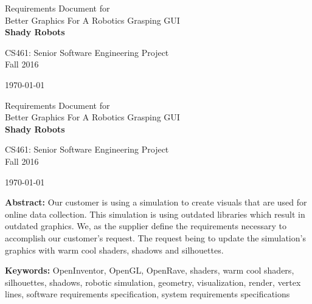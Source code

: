 \onecolumn

\begin{titlepage}
\null
\vspace{35mm}

\begin{flushleft}
\begin{bfseries}
	\vskip2mm
	\Huge{Requirements Document for\\ Better Graphics For A Robotics Grasping GUI}\\
	\vspace{30mm}
	\textbf{\huge Shady Robots} \\
	
\end{bfseries}

\vspace{15mm}
\Large{CS461: Senior Software Engineering Project} \\
\Large{Fall 2016} \\

\vspace{10mm}

\today

\end{flushleft}

\newpage
\null
\vspace{35mm}

\begin{flushleft}
\begin{bfseries}
	\vskip2mm
	\Huge{Requirements Document for\\ Better Graphics For A Robotics Grasping GUI}\\
	\vspace{30mm}
	\textbf{\huge Shady Robots} \\
	
\end{bfseries}

\vspace{15mm}
\Large{CS461: Senior Software Engineering Project} \\
\Large{Fall 2016} \\

\vspace{10mm}

\today

\vfill

\begin{normalsize}
{\bf Abstract:}
Our customer is using a simulation to create visuals that are used for online data collection.
This simulation is using outdated libraries which result in outdated graphics.
We, as the supplier define the requirements necessary to accomplish our customer's request.
The request being to update the simulation's graphics with warm cool shaders, shadows and silhouettes.

{\bf Keywords:} OpenInventor, OpenGL, OpenRave, shaders, warm cool shaders, silhouettes, shadows, robotic simulation, geometry, visualization, render,
vertex lines, software requirements specification, system requirements specifications
\end{normalsize}
\end{flushleft}

\newpage

\end{titlepage}

